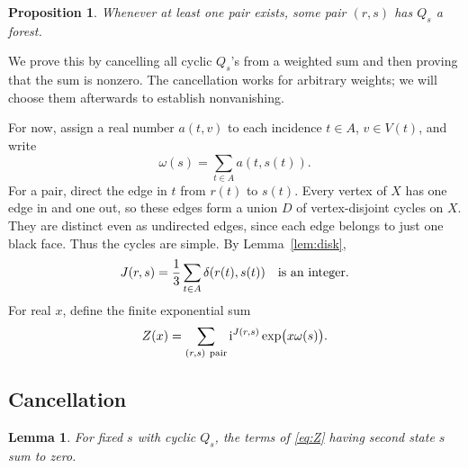 \documentclass[11pt]{article}
\newtheorem{lemma}[theorem]{Lemma}
\newtheorem{proposition}[theorem]{Proposition}
\theoremstyle{remark}
\newcommand{\ii}{\mathrm i}
\numberwithin{equation}{section}
\begin{document}
\begin{proposition}\label{prop:forest-state}
Whenever at least one pair exists, some pair \((r,s)\) has
\(Q_s\) a forest.
\end{proposition}

We prove this by cancelling all cyclic \(Q_s\)'s from a
weighted sum and then proving that the sum is nonzero.
The cancellation works for arbitrary weights; we will choose them
afterwards to establish nonvanishing.

For now, assign a real number \(a(t,v)\) to each incidence
\(t\in A\), \(v\in V(t)\), and write
\[
 \omega(s)=\sum_{t\in A}a(t,s(t)).
\]
For a pair, direct the edge in \(t\) from \(r(t)\) to
\(s(t)\). Every vertex of \(X\) has one edge in and one
out, so these edges form a union \(D\) of vertex-disjoint
cycles on \(X\). They are distinct even as undirected
edges, since each edge belongs to just one black face.
Thus the cycles are simple. By Lemma~\ref{lem:disk},
\begin{equation}\label{eq:J}
 J(r,s)=\frac13\sum_{t\in A}\delta(r(t),s(t))
 \quad\hbox{is an integer}.
\end{equation}
For real \(x\), define the finite exponential sum
\begin{equation}\label{eq:Z}
 Z(x)=\sum_{(r,s)\ {\rm pair}}
             \ii^{J(r,s)}\exp\bigl(x\omega(s)\bigr).
\end{equation}

\subsection{Cancellation}

\begin{lemma}\label{lem:cancel}
For fixed \(s\) with cyclic \(Q_s\), the terms of
\eqref{eq:Z} having second state \(s\) sum to zero.
\end{lemma}
\end{document}
